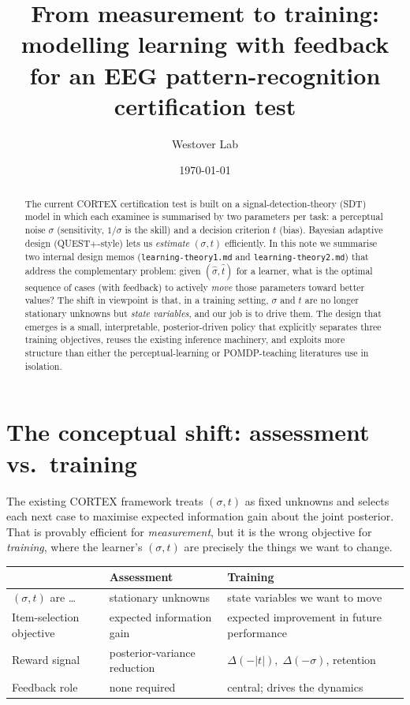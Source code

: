 \documentclass[11pt]{article}
\title{From measurement to training:\\
  \large modelling learning with feedback for an EEG pattern-recognition
  certification test}
\author{Westover Lab}
\date{\today}
\begin{document}
\maketitle

\begin{abstract}
The current CORTEX certification test is built on a signal-detection-theory
(SDT) model in which each examinee is summarised by two parameters per
task: a perceptual noise $\sigma$ (sensitivity, $1/\sigma$ is the skill)
and a decision criterion $t$ (bias). Bayesian adaptive design
(QUEST$+$-style) lets us \emph{estimate} $(\sigma,t)$ efficiently. In
this note we summarise two internal design memos
(\texttt{learning-theory1.md} and \texttt{learning-theory2.md}) that
address the complementary problem: given $(\hat\sigma,\hat t)$ for a
learner, what is the optimal sequence of cases (with feedback) to
actively \emph{move} those parameters toward better values?
The shift in viewpoint is that, in a training setting, $\sigma$ and $t$
are no longer stationary unknowns but \emph{state variables}, and our
job is to drive them. The design that emerges is a small,
interpretable, posterior-driven policy that explicitly separates three
training objectives, reuses the existing inference machinery, and
exploits more structure than either the perceptual-learning or
POMDP-teaching literatures use in isolation.
\end{abstract}

\section{The conceptual shift: assessment vs.\ training}
\label{sec:shift}

The existing CORTEX framework treats $(\sigma,t)$ as fixed unknowns
and selects each next case to maximise expected information gain about
the joint posterior. That is provably efficient for \emph{measurement},
but it is the wrong objective for \emph{training}, where the learner's
$(\sigma,t)$ are precisely the things we want to change.

\begin{center}
\begin{tabular}{@{}lll@{}}
\toprule
 & \textbf{Assessment} & \textbf{Training} \\
\midrule
$(\sigma,t)$ are \dots & stationary unknowns & state variables we want to move \\
Item-selection objective & expected information gain & expected improvement in future performance \\
Reward signal & posterior-variance reduction & $\Delta(-|t|),\;\Delta(-\sigma)$, retention \\
Feedback role & none required & central; drives the dynamics \\
\bottomrule
\end{tabular}
\end{center}
\end{document}
